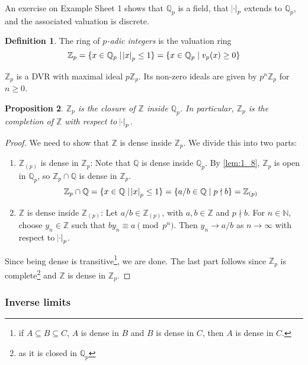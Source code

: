 \documentclass[11pt]{article}
\theoremstyle{definition}
\newtheorem{definition}{Definition}[subsection]
\theoremstyle{plain}
\newtheorem{proposition}[definition]{Proposition}
\theoremstyle{remark}
\newcommand{\bN}{\mathbb{N}}
\newcommand{\bZ}{\mathbb{Z}}
\newcommand{\bQ}{\mathbb{Q}}
\begin{document}
An exercise on Example Sheet 1 shows that $\bQ_p$ is a field, that $\abs{\cdot}_p$ extends to $\bQ_p$, and the associated valuation is discrete.

\begin{definition}
    The ring of \emph{$p$-adic integers} is the valuation ring
    \begin{equation*}
        \bZ_p = \{x \in \bQ_p \mid \abs{x}_p \le 1\} = \{x \in \bQ_p \mid v_p(x) \ge 0\}
    \end{equation*}
\end{definition}

\noindent $\bZ_p$ is a DVR with maximal ideal $p \bZ_p$. Its non-zero ideals are given by $p^n \bZ_p$ for $n \ge 0$.

\begin{proposition}\label{prop:3_2}
    $\bZ_p$ is the closure of $\bZ$ inside $\bQ_p$. In particular, $\bZ_p$ is the completion of $\bZ$ with respect to $\abs{\cdot}_p$.
\end{proposition}
\begin{proof}
    We need to show that $\bZ$ is dense inside $\bZ_p$. We divide this into two parts:
    \begin{enumerate}
        \item $\bZ_{(p)}$ is dense in $\bZ_p$: Note that $\bQ$ is dense inside $\bQ_p$. By \autoref{lem:1_8}, $\bZ_p$ is open in $\bQ_p$, so $\bZ_p \cap \bQ$ is dense in $\bZ_p$.
            \begin{equation*}
                \bZ_p \cap \bQ = \{x \in \bQ \mid \abs{x}_p \le 1\} = \{a/b \in \bQ \mid p \nmid b\} = \bZ_{(p)}
            \end{equation*}
        \item $\bZ$ is dense inside $\bZ_{(p)}$:
    Let $a/b \in \bZ_{(p)}$, with $a, b \in \bZ$ and $p \nmid b$. For $n \in \bN$, choose $y_n \in \bZ$ such that $b y_n \equiv a \pmod{p^n}$. Then $y_n \to a/b$ as $n \to \infty$ with respect to $\abs{\cdot}_p$.
    \end{enumerate}
    Since being dense is transitive\footnote{if $A \subseteq B \subseteq C$, $A$ is dense in $B$ and $B$ is dense in $C$, then $A$ is dense in $C$.}, we are done. The last part follows since $\bZ_p$ is complete\footnote{as it is closed in $\bQ_p$} and $\bZ$ is dense in $\bZ_p$.
\end{proof}

\subsubsection*{Inverse limits}
\end{document}
